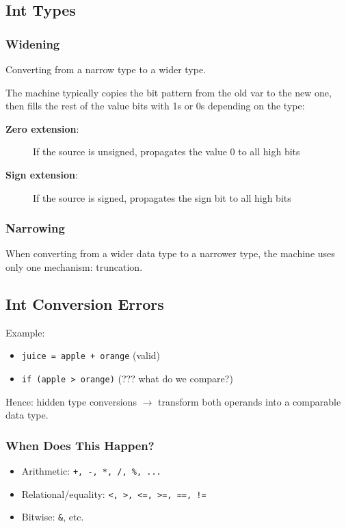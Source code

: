 \documentclass[11pt,a4paper]{article}
\begin{document}
\subsection{Int Types}

\subsubsection{Widening}
Converting from a narrow type to a wider type.

The machine typically copies the bit pattern from the old var to the new one, then fills the rest of the value bits with 1s or 0s depending on the type:

\begin{description}
    \item[\textbf{Zero extension}:] If the source is unsigned, propagates the value 0 to all high bits
    \item[\textbf{Sign extension}:] If the source is signed, propagates the sign bit to all high bits
\end{description}

\subsubsection{Narrowing}
When converting from a wider data type to a narrower type, the machine uses only one mechanism: truncation.

\subsection{Int Conversion Errors}

Example:
\begin{itemize}
    \item \texttt{juice = apple + orange} (valid)
    \item \texttt{if (apple > orange)} (??? what do we compare?)
\end{itemize}

Hence: hidden type conversions $\rightarrow$ transform both operands into a comparable data type.

\subsubsection{When Does This Happen?}
\begin{itemize}
    \item Arithmetic: \texttt{+, -, *, /, \%, ...}
    \item Relational/equality: \texttt{<, >, <=, >=, ==, !=}
    \item Bitwise: \texttt{\&}, etc.
\end{itemize}
\end{document}
